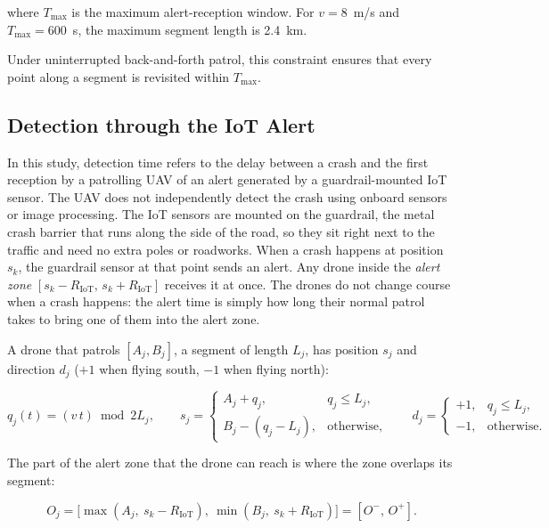 \documentclass[11pt]{article}
\begin{document}
where $T_{\max}$ is the maximum alert-reception window. For $v=8$~m/s
and $T_{\max}=600$~s, the maximum segment length is 2.4~km.

Under uninterrupted back-and-forth patrol, this constraint ensures
that every point along a segment is revisited within $T_{\max}$.

\subsection{Detection through the IoT Alert}
\label{sec:detection}


In this study, detection time refers to the delay between a crash and the first reception by a patrolling UAV of an alert generated by a guardrail-mounted IoT sensor. The UAV does not independently detect the crash using onboard sensors or image processing.
The IoT sensors are mounted on the guardrail, the metal crash barrier that runs along the side of the road, so they sit right next to the traffic and need no extra poles or roadworks. When a crash happens at position $s_k$, the guardrail sensor at that point sends an alert. Any drone inside the \emph{alert zone}
$[s_k-R_{\mathrm{IoT}},\,s_k+R_{\mathrm{IoT}}]$ receives it at once. The drones
do not change course when a crash happens: the alert time is simply how long
their normal patrol takes to bring one of them into the alert zone.

A drone that patrols $[A_j,B_j]$, a segment of length $L_j$, has position $s_j$
and direction $d_j$ ($+1$ when flying south, $-1$ when flying north):

\begin{equation}
q_j(t)=(v\,t)\bmod 2L_j,\qquad
s_j=\begin{cases} A_j+q_j, & q_j\le L_j,\\ B_j-(q_j-L_j), & \text{otherwise,}\end{cases}
\qquad
d_j=\begin{cases}+1, & q_j\le L_j,\\ -1, & \text{otherwise.}\end{cases}
\label{eq:motion}
\end{equation}

The part of the alert zone that the drone can reach is where the zone overlaps
its segment:

\begin{equation}
O_j=\big[\max(A_j,\ s_k-R_{\mathrm{IoT}}),\ \min(B_j,\ s_k+R_{\mathrm{IoT}})\big]
=[O^-,\,O^+].
\label{eq:overlap}
\end{equation}
\end{document}
